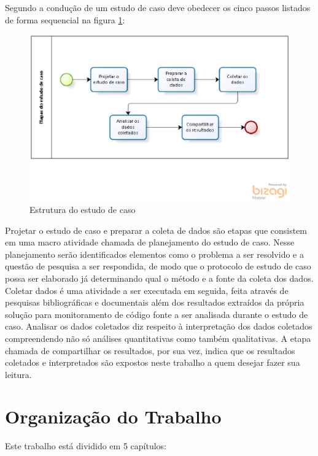 Segundo  a condução de um estudo de caso deve obedecer os cinco passos listados de forma sequencial na figura \ref{fig:estudodecaso}: 

\begin{figure}[h!]
\centering
\includegraphics[keepaspectratio=false,scale=0.8]{figuras/figuras_matheus/estudodecaso.eps}
\caption{Estrutura do estudo de caso}
\label{fig:estudodecaso}
\end{figure}
\FloatBarrier

Projetar o estudo de caso e preparar a coleta de dados são etapas que consistem em uma macro atividade chamada de planejamento do estudo de caso. Nesse planejamento serão identificados elementos como o problema a ser resolvido e a questão de pesquisa a ser respondida, de modo que o protocolo de estudo de caso possa ser elaborado já determinando qual o método e a fonte da coleta dos dados. Coletar dados é uma atividade a ser executada em seguida, feita através de pesquisas bibliográficas e documentais além dos resultados extraídos da própria solução para monitoramento de código fonte a ser analisada durante o estudo de caso. Analisar os dados coletados diz respeito à interpretação dos dados coletados compreendendo não só análises quantitativas como também qualitativas. A etapa chamada de compartilhar os resultados, por sua vez, indica que os resultados coletados e interpretados são expostos neste trabalho a quem desejar fazer sua leitura. 


\section{Organização do Trabalho}

Este trabalho está dividido em 5 capítulos:

